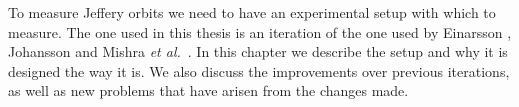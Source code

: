 To measure Jeffery orbits we need to have an experimental setup with which to measure. The one used in this thesis is an iteration of the one used by Einarsson \cite{JonasThesis}, Johansson \cite{AntonThesis} and Mishra \emph{et al.}~\cite{JonasExperiment}. In this chapter we describe the setup and why it is designed the way it is. We also discuss the improvements over previous iterations, as well as new problems that have arisen from the changes made.